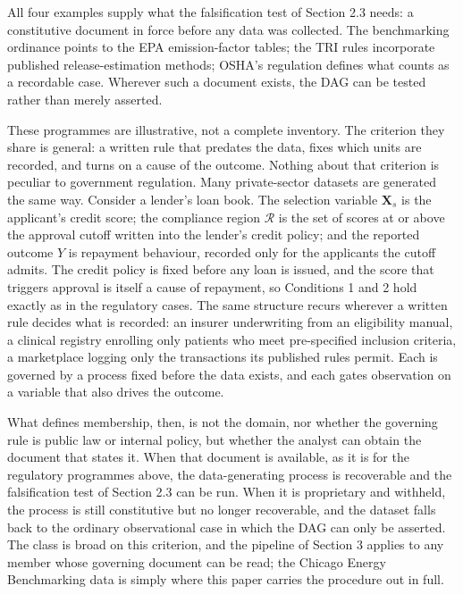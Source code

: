 All four examples supply what the falsification test of Section 2.3 needs: a constitutive document in force before any data was collected. The benchmarking ordinance points to the EPA emission-factor tables; the TRI rules incorporate published release-estimation methods; OSHA's regulation defines what counts as a recordable case. Wherever such a document exists, the DAG can be tested rather than merely asserted.

These programmes are illustrative, not a complete inventory. The criterion they share is general: a written rule that predates the data, fixes which units are recorded, and turns on a cause of the outcome. Nothing about that criterion is peculiar to government regulation. Many private-sector datasets are generated the same way. Consider a lender's loan book. The selection variable $\mathbf{X}_s$ is the applicant's credit score; the compliance region $\mathcal{R}$ is the set of scores at or above the approval cutoff written into the lender's credit policy; and the reported outcome $Y$ is repayment behaviour, recorded only for the applicants the cutoff admits. The credit policy is fixed before any loan is issued, and the score that triggers approval is itself a cause of repayment, so Conditions 1 and 2 hold exactly as in the regulatory cases. The same structure recurs wherever a written rule decides what is recorded: an insurer underwriting from an eligibility manual, a clinical registry enrolling only patients who meet pre-specified inclusion criteria, a marketplace logging only the transactions its published rules permit. Each is governed by a process fixed before the data exists, and each gates observation on a variable that also drives the outcome.

What defines membership, then, is not the domain, nor whether the governing rule is public law or internal policy, but whether the analyst can obtain the document that states it. When that document is available, as it is for the regulatory programmes above, the data-generating process is recoverable and the falsification test of Section 2.3 can be run. When it is proprietary and withheld, the process is still constitutive but no longer recoverable, and the dataset falls back to the ordinary observational case in which the DAG can only be asserted. The class is broad on this criterion, and the pipeline of Section 3 applies to any member whose governing document can be read; the Chicago Energy Benchmarking data is simply where this paper carries the procedure out in full.

